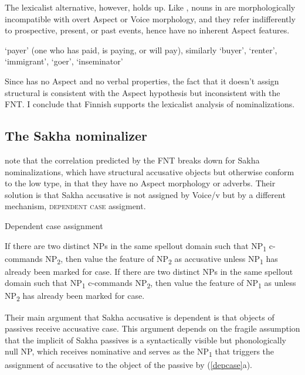 \documentclass[output=paper,
modfonts
]{LSP/langsci}
\newcommand{\rfa}[2]{(\ref{#1}{#2})}
\begin{document}
The lexicalist alternative, however, holds up.  Like  , nouns in
 are morphologically incompatible with overt Aspect or Voice morphology, and
 they refer indifferently to prospective, present, or past events, hence
have no inherent Aspect features.
\begin{exe}
\ex
   `payer' (one who has paid, is paying, or will pay), similarly
   `buyer',  `renter',  `immigrant',
  `goer',  `inseminator'
\end{exe} 
Since  has no Aspect  and no verbal properties, the fact that it
doesn't assign structural  is consistent with the Aspect hypothesis but
inconsistent with the FNT.  I conclude that Finnish  supports the lexicalist
analysis of nominalizations.

\subsection{The Sakha  nominalizer }

\citet[536]{baker2009} note that the correlation predicted by the FNT breaks down for Sakha 
nominalizations, which have structural accusative objects but otherwise conform to the low
type, in that they have no Aspect morphology or adverbs.  Their solution is that Sakha
accusative  is not assigned by Voice/v but by a different mechanism, \textsc{dependent
  case} assigment.
\begin{exe}
\ex\label{depcase}
{Dependent case assignment}  \citep{marantz1991,baker2015}

\ea If there are two distinct NPs in the same spellout domain such that NP\textsubscript{1} c-commands NP\textsubscript{2},
  then value the  feature of NP\textsubscript{2} as accusative unless NP\textsubscript{1} has already been marked for case.
\ex If there are two distinct NPs in the same spellout domain such that NP\textsubscript{1} c-commands NP\textsubscript{2},
  then value the  feature of NP\textsubscript{1} as  unless NP\textsubscript{2} has already been marked for case.
 \z 
\end{exe}
Their main argument that Sakha accusative is dependent  is that objects of passives receive
accusative case.  This argument depends on the fragile assumption that the implicit  of
Sakha passives is a syntactically visible but phonologically null NP, which receives nominative
 and serves as the NP\textsubscript{1} that triggers the assignment of accusative  to the object of the
passive by \rfa{depcase}{a}.
\end{document}
